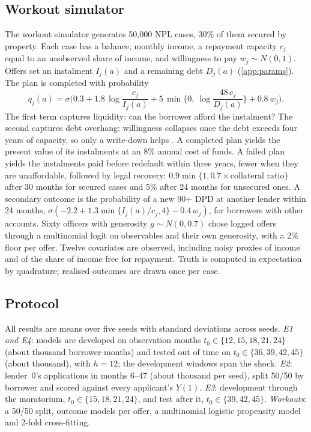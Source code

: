 \documentclass[10pt]{article}
\begin{document}
\begin{table}[t]
\centering\small
\caption{Simulator moments, averaged over five seeds.}
\label{tab:calibration}

\end{table}

\subsection{Workout simulator}

The workout simulator generates 50,000 NPL cases, 30\% of them secured by property. Each case has a balance, monthly income, a repayment capacity $c_j$ equal to an unobserved share of income, and willingness to pay $w_j\sim N(0,1)$. Offers set an instalment $I_j(a)$ and a remaining debt $D_j(a)$ (\cref{app:params}). The plan is completed with probability
\begin{equation}\label{eq:complete}
q_j(a) = \sigma\Big(0.3 + 1.8\,\log\frac{c_j}{I_j(a)} + 5\,\min\Big\{0,\ \log\frac{48\,c_j}{D_j(a)}\Big\} + 0.8\,w_j\Big).
\end{equation}
The first term captures liquidity: can the borrower afford the instalment? The second captures debt overhang: willingness collapses once the debt exceeds four years of capacity, so only a write-down helps \citep{ganong2020,dobbie2020targeted}. A completed plan yields the present value of its instalments at an 8\% annual cost of funds. A failed plan yields the instalments paid before redefault within three years, fewer when they are unaffordable, followed by legal recovery: $0.9\min\{1, 0.7\times\text{collateral ratio}\}$ after 30 months for secured cases and 5\% after 24 months for unsecured ones. A secondary outcome is the probability of a new 90+ DPD at another lender within 24 months, $\sigma(-2.2 + 1.3\min\{I_j(a)/c_j, 4\} - 0.4\,w_j)$, for borrowers with other accounts. Sixty officers with generosity $g\sim N(0,0.7)$ chose logged offers through a multinomial logit on observables and their own generosity, with a 2\% floor per offer. Twelve covariates are observed, including noisy proxies of income and of the share of income free for repayment. Truth is computed in expectation by quadrature; realised outcomes are drawn once per case.

\subsection{Protocol}

All results are means over five seeds with standard deviations across seeds. \emph{E1 and E4}: models are developed on observation months $t_0\in\{12,15,18,21,24\}$ (about \EoneNdev{} thousand borrower-months) and tested out of time on $t_0\in\{36,39,42,45\}$ (about \EoneNoot{} thousand), with $h=12$; the development windows span the shock. \emph{E2}: lender~0's applications in months 6--47 (about \EtwoNapps{} thousand per seed), split 50/50 by borrower and scored against every applicant's $Y(1)$. \emph{E3}: development through the moratorium, $t_0\in\{15,18,21,24\}$, and test after it, $t_0\in\{39,42,45\}$. \emph{Workouts}: a 50/50 split, outcome models per offer, a multinomial logistic propensity model and 2-fold cross-fitting.
\end{document}
